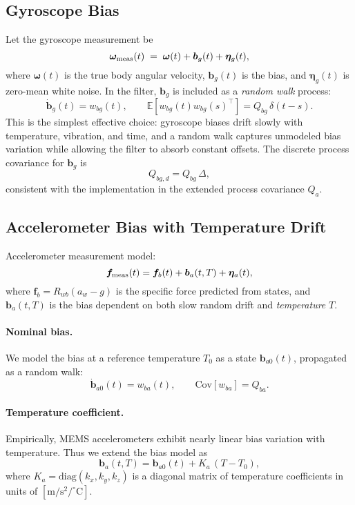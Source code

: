 \documentclass[10pt]{extarticle}
\begin{document}
\subsection{Gyroscope Bias}
Let the gyroscope measurement be
\begin{equation}
\bm\omega_{\rm meas}(t) \;=\; \bm\omega(t) + \bm b_g(t) + \bm\eta_g(t),
\label{eq:gyro-meas}
\end{equation}
where $\bm\omega(t)$ is the true body angular velocity, $\bm b_g(t)$ is the bias,
and $\bm\eta_g(t)$ is zero-mean white noise. In the filter, $\bm b_g$ is included as
a \emph{random walk} process:
\begin{equation}
\dot{\bm b}_g(t) = w_{bg}(t),\qquad
\mathbb{E}[w_{bg}(t)w_{bg}(s)^\top] = Q_{bg}\,\delta(t-s).
\label{eq:gyro-bias-model}
\end{equation}
This is the simplest effective choice: gyroscope biases drift slowly with temperature, vibration,
and time, and a random walk captures unmodeled bias variation while allowing the filter to absorb
constant offsets. The discrete process covariance for $\bm b_g$ is
\begin{equation}
Q_{bg,d} = Q_{bg}\,\Delta,
\label{eq:gyro-bias-qd}
\end{equation}
consistent with the implementation in the extended process covariance $Q_a$.

\subsection{Accelerometer Bias with Temperature Drift}
Accelerometer measurement model:
\begin{equation}
\bm f_{\rm meas}(t) = \bm f_b(t) + \bm b_a(t,T) + \bm\eta_a(t),
\label{eq:acc-meas}
\end{equation}
where $\bm f_b=R_{wb}(a_w-g)$ is the specific force predicted from states, and 
$\bm b_a(t,T)$ is the bias dependent on both slow random drift and \emph{temperature} $T$.

\paragraph{Nominal bias.}
We model the bias at a reference temperature $T_0$ as a state $\bm b_{a0}(t)$,
propagated as a random walk:
\begin{equation}
\dot{\bm b}_{a0}(t) = w_{ba}(t),\qquad
\mathrm{Cov}[w_{ba}] = Q_{ba}.
\label{eq:acc-bias-base}
\end{equation}

\paragraph{Temperature coefficient.}
Empirically, MEMS accelerometers exhibit nearly linear bias variation with temperature.
Thus we extend the bias model as
\begin{equation}
\bm b_a(t,T) = \bm b_{a0}(t) + K_a\,(T-T_0),
\label{eq:acc-bias-temp}
\end{equation}
where $K_a=\mathrm{diag}(k_x,k_y,k_z)$ is a diagonal matrix of temperature coefficients
in units of $[\mathrm{m/s^2}/^\circ\mathrm{C}]$.
\end{document}
